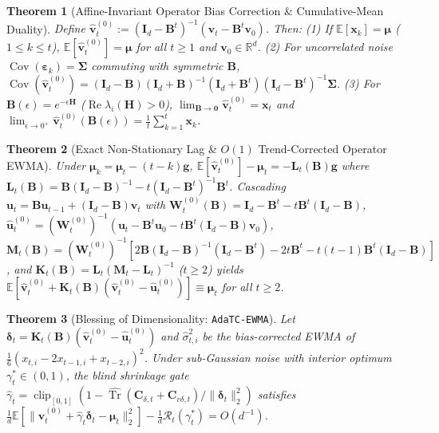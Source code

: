 \documentclass[11pt]{article}
\newtheorem{theorem}{Theorem}
\begin{document}
\begin{theorem}[Affine-Invariant Operator Bias Correction \& Cumulative-Mean Duality]
Define $\hat{\mathbf{v}}_t^{(0)} := (\mathbf{I}_d - \mathbf{B}^t)^{-1}(\mathbf{v}_t - \mathbf{B}^t\mathbf{v}_0)$. Then:
(1) If $\mathbb{E}[\mathbf{x}_k] = \bm{\mu}$ ($1 \le k \le t$), $\mathbb{E}[\hat{\mathbf{v}}_t^{(0)}] = \bm{\mu}$ for all $t \ge 1$ and $\mathbf{v}_0 \in \mathbb{R}^d$.
(2) For uncorrelated noise $\operatorname{Cov}(\bm{\varepsilon}_k) = \bm{\Sigma}$ commuting with symmetric $\mathbf{B}$, $\operatorname{Cov}(\hat{\mathbf{v}}_t^{(0)}) = (\mathbf{I}_d - \mathbf{B})(\mathbf{I}_d + \mathbf{B})^{-1}(\mathbf{I}_d + \mathbf{B}^t)(\mathbf{I}_d - \mathbf{B}^t)^{-1}\bm{\Sigma}$.
(3) For $\mathbf{B}(\epsilon) = e^{-\epsilon\mathbf{H}}$ ($\operatorname{Re}\lambda_i(\mathbf{H}) > 0$), $\lim_{\mathbf{B}\to\mathbf{0}}\hat{\mathbf{v}}_t^{(0)} = \mathbf{x}_t$ and $\lim_{\epsilon\to 0^+}\hat{\mathbf{v}}_t^{(0)}(\mathbf{B}(\epsilon)) = \frac{1}{t}\sum_{k=1}^t \mathbf{x}_k$.
\end{theorem}

\begin{theorem}[Exact Non-Stationary Lag \& $O(1)$ Trend-Corrected Operator EWMA]
Under $\bm{\mu}_k = \bm{\mu}_t - (t - k)\mathbf{g}$, $\mathbb{E}[\hat{\mathbf{v}}_t^{(0)}] - \bm{\mu}_t = -\mathbf{L}_t(\mathbf{B})\mathbf{g}$ where $\mathbf{L}_t(\mathbf{B}) = \mathbf{B}(\mathbf{I}_d - \mathbf{B})^{-1} - t(\mathbf{I}_d - \mathbf{B}^t)^{-1}\mathbf{B}^t$. Cascading $\mathbf{u}_t = \mathbf{B}\mathbf{u}_{t-1} + (\mathbf{I}_d - \mathbf{B})\mathbf{v}_t$ with $\mathbf{W}_t^{(0)}(\mathbf{B}) = \mathbf{I}_d - \mathbf{B}^t - t\mathbf{B}^t(\mathbf{I}_d - \mathbf{B})$, $\hat{\mathbf{u}}_t^{(0)} = (\mathbf{W}_t^{(0)})^{-1}(\mathbf{u}_t - \mathbf{B}^t\mathbf{u}_0 - t\mathbf{B}^t(\mathbf{I}_d - \mathbf{B})\mathbf{v}_0)$, $\mathbf{M}_t(\mathbf{B}) = (\mathbf{W}_t^{(0)})^{-1}[2\mathbf{B}(\mathbf{I}_d - \mathbf{B})^{-1}(\mathbf{I}_d - \mathbf{B}^t) - 2t\mathbf{B}^t - t(t-1)\mathbf{B}^t(\mathbf{I}_d - \mathbf{B})]$, and $\mathbf{K}_t(\mathbf{B}) = \mathbf{L}_t(\mathbf{M}_t - \mathbf{L}_t)^{-1}$ ($t \ge 2$) yields $\mathbb{E}[\hat{\mathbf{v}}_t^{(0)} + \mathbf{K}_t(\mathbf{B})(\hat{\mathbf{v}}_t^{(0)} - \hat{\mathbf{u}}_t^{(0)})] \equiv \bm{\mu}_t$ for all $t \ge 2$.
\end{theorem}

\begin{theorem}[Blessing of Dimensionality: \texttt{AdaTC-EWMA}]
Let $\bm{\delta}_t = \mathbf{K}_t(\mathbf{B})(\hat{\mathbf{v}}_t^{(0)} - \hat{\mathbf{u}}_t^{(0)})$ and $\hat{\sigma}_{t,i}^2$ be the bias-corrected EWMA of $\frac{1}{6}(x_{t,i} - 2x_{t-1,i} + x_{t-2,i})^2$. Under sub-Gaussian noise with interior optimum $\gamma_t^* \in (0, 1)$, the blind shrinkage gate $\hat{\gamma}_t = \operatorname{clip}_{[0,1]}(1 - \widehat{\operatorname{Tr}}(\mathbf{C}_{\delta,t} + \mathbf{C}_{v\delta,t}) / \|\bm{\delta}_t\|_2^2)$ satisfies $\frac{1}{d}\mathbb{E}[\|\hat{\mathbf{v}}_t^{(0)} + \hat{\gamma}_t\bm{\delta}_t - \bm{\mu}_t\|_2^2] - \frac{1}{d}\mathcal{R}_t(\gamma_t^*) = O(d^{-1})$.
\end{theorem}
\end{document}
